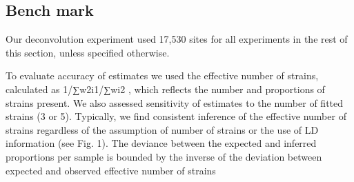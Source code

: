 \documentclass{article}
\begin{document}
\subsection{Bench mark}

Our deconvolution experiment used 17,530 sites for all experiments in the rest of this section, unless specified otherwise.

To evaluate accuracy of estimates we used the effective number of strains, calculated as  1/∑w2i1/∑wi2 , which reflects the number and proportions of strains present. We also assessed sensitivity of estimates to the number of fitted strains (3 or 5). Typically, we find consistent inference of the effective number of strains regardless of the assumption of number of strains or the use of LD information (see Fig. 1). The deviance between the expected and inferred proportions per sample is bounded by the inverse of the deviation between expected and observed effective number of strains
\end{document}
